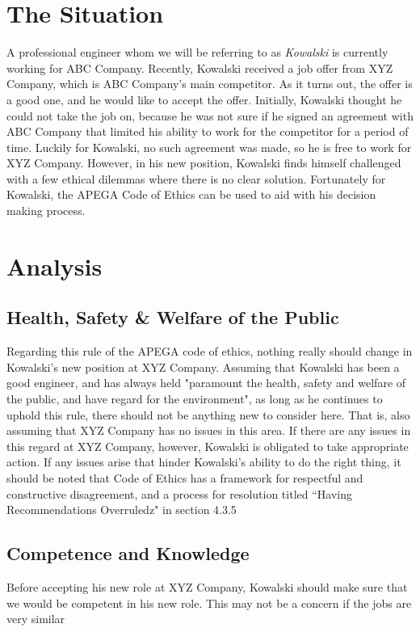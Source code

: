 \documentclass[letterpaper,12pt]{article}
\begin{document}
\section{The Situation}
A professional engineer whom we will be referring to as \textit{Kowalski} is currently working for ABC Company.
Recently, Kowalski received a job offer from XYZ Company, which is ABC Company's main competitor. As it turns out,
the offer is a good one, and he would like to accept the offer. Initially, Kowalski thought he could not take 
the job on, because he was not sure if he signed an agreement with ABC Company that limited his ability to work for the
competitor for a period of time. Luckily for Kowalski, no such agreement was made, so he is free to work for XYZ Company.
However, in his new position, Kowalski finds himself challenged with a few ethical dilemmas where there is no clear solution.
Fortunately for Kowalski, the APEGA Code of Ethics can be used to aid with his decision making process. 


\section{Analysis}

\subsection{Health, Safety \& Welfare of the Public}
Regarding this rule of the APEGA code of ethics, nothing really should change in Kowalski's new position at XYZ Company.
Assuming that Kowalski has been a good engineer, and has always held "paramount the health, safety and welfare of the public, and have regard for the
environment"\cite{apegacode}, as long as he continues to uphold this rule, there should not be anything new to consider here. That is,
also assuming that XYZ Company has no issues in this area. If there are any issues in this regard at XYZ Company, however, Kowalski is obligated to take appropriate action.
If any issues arise that hinder Kowalski's ability to do the right thing, it should be noted that Code of Ethics has a framework for respectful and constructive disagreement, and a process for
resolution titled “Having Recommendations Overruledz" in section 4.3.5

\subsection{Competence and Knowledge}
Before accepting his new role at XYZ Company, Kowalski should make sure that we would be competent in his new role.
This may not be a concern if the jobs are very similar
\end{document}
